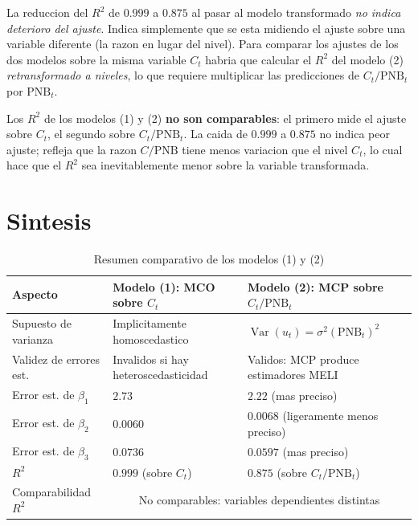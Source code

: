 \documentclass[12pt, letterpaper]{article}
\theoremstyle{remark}
\newcommand{\Var}{\operatorname{Var}}
\begin{document}
La reduccion del $R^2$ de $0.999$ a $0.875$ al pasar al modelo transformado
\emph{no indica deterioro del ajuste}. Indica simplemente que se esta midiendo
el ajuste sobre una variable diferente (la razon en lugar del nivel). Para
comparar los ajustes de los dos modelos sobre la misma variable $C_t$ habria
que calcular el $R^2$ del modelo (2) \emph{retransformado a niveles}, lo que
requiere multiplicar las predicciones de $C_t/\text{PNB}_t$ por $\text{PNB}_t$.

\begin{clave}
  Los $R^2$ de los modelos (1) y (2) \textbf{no son comparables}: el primero
  mide el ajuste sobre $C_t$, el segundo sobre $C_t/\text{PNB}_t$. La caida
  de $0.999$ a $0.875$ no indica peor ajuste; refleja que la razon $C/\text{PNB}$
  tiene menos variacion que el nivel $C_t$, lo cual hace que el $R^2$ sea
  inevitablemente menor sobre la variable transformada.
\end{clave}

\section{Sintesis}

\begin{table}[ht]
\centering
\caption{Resumen comparativo de los modelos (1) y (2)}
\label{tab:sintesis}
\small
\begin{tabular}{p{3.5cm} p{5cm} p{5cm}}
\toprule
\textbf{Aspecto}
  & \textbf{Modelo (1): MCO sobre $C_t$}
  & \textbf{Modelo (2): MCP sobre $C_t/\text{PNB}_t$} \\
\midrule
Supuesto de varianza
  & Implicitamente homoscedastico
  & $\Var(u_t) = \sigma^2(\text{PNB}_t)^2$ \\[4pt]
Validez de errores est.
  & Invalidos si hay heteroscedasticidad
  & Validos: MCP produce estimadores MELI \\[4pt]
Error est. de $\beta_1$
  & $2.73$
  & $2.22$ (mas preciso) \\[4pt]
Error est. de $\beta_2$
  & $0.0060$
  & $0.0068$ (ligeramente menos preciso) \\[4pt]
Error est. de $\beta_3$
  & $0.0736$
  & $0.0597$ (mas preciso) \\[4pt]
$R^2$
  & $0.999$ (sobre $C_t$)
  & $0.875$ (sobre $C_t/\text{PNB}_t$) \\[4pt]
Comparabilidad $R^2$
  & \multicolumn{2}{c}{No comparables: variables dependientes distintas} \\
\bottomrule
\end{tabular}
\end{table}
\end{document}
